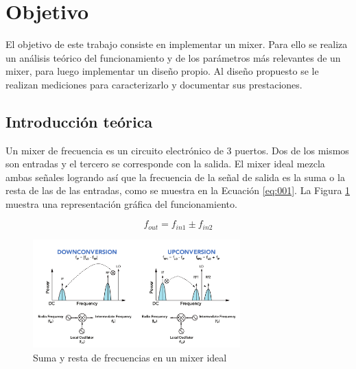 \documentclass[a4paper,10pt]{article}
\title{  }
\begin{document}
	\maketitle %
	\newpage

	\tableofcontents %
	\newpage


\section{Objetivo}
\indent El objetivo de este trabajo consiste en implementar un mixer. Para ello 
se realiza un an\'alisis te\'orico del funcionamiento y de los par\'ametros 
m\'as relevantes de un mixer, para luego implementar un dise\~no propio. Al 
dise\~no propuesto se le realizan mediciones para caracterizarlo y documentar 
sus prestaciones.

\newpage
\subsection{Introducción teórica}
	\indent Un mixer de frecuencia es un circuito electrónico de 3 puertos. Dos
	de los mismos son entradas y el tercero se corresponde con la salida. El 
	mixer ideal mezcla ambas señales logrando así que la frecuencia de la señal 
	de salida es la suma o la resta de las de las entradas, como se muestra en 
	la Ecuación \ref{eq:001}. La Figura \ref{img:001} muestra una representación
	gráfica del funcionamiento.
	
	\begin{equation}\label{eq:001}
		f_{out} = f_{in1} \pm f_{in2}
	\end{equation}

	\begin{figure}[!htb]
		\centering
		\includegraphics[width=8cm]
		{Images/MixerFunction.png}
		\caption{Suma y resta de frecuencias en un mixer ideal}
		\label{img:001} 
	\end{figure}
\end{document}
